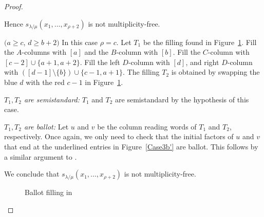 \begin{proof}
\begin{Case}
Hence $s_{\lambda/\mu}(x_1,\ldots,x_{\rho+2})$ is not multiplicity-free.


\end{Case}

\begin{Case}
{ $(a\geq c$, $d\geq b+2)$} 
In this case $\rho = c$. Let $T_1$ be the filling found in Figure~\ref{Case3b''}. Fill the $A$-columns with $[a]$ and the $B$-column with $[b]$. Fill the $C$-column with $[c-2]\cup \{ a+1, a+2\}$. Fill the left $D$-column with $[d]$, and right $D$-column with $([d-1]\setminus\{b\})\cup\{ c-1, a+1\}$. The filling $T_2$ is obtained by swapping the blue $d$ with the red $c-1$ in Figure~\ref{Case3b''}.

\emph{$T_1,T_2$ are semistandard:} $T_1$ and $T_2$ are semistandard by the hypothesis of this case.

\emph{$T_1,T_2$ are ballot:} Let $u$ and $v$ be the column reading words of $T_1$ and $T_2$, respectively. Once again, we only need to check that the initial factors of $u$ and $v$ that end at the underlined entries in Figure~\ref{Case3b'} are ballot. This follows by a similar argument to .

We conclude that $s_{\lambda/\mu}(x_1,\ldots,x_{\rho+2})$ is not multiplicity-free.

\begin{figure}[htb]\centering
 \caption[Ballot filling in Case 3.2.2]{Ballot filling in }
 \label{Case3b''}
\end{figure}



\end{Case}
\end{proof}
